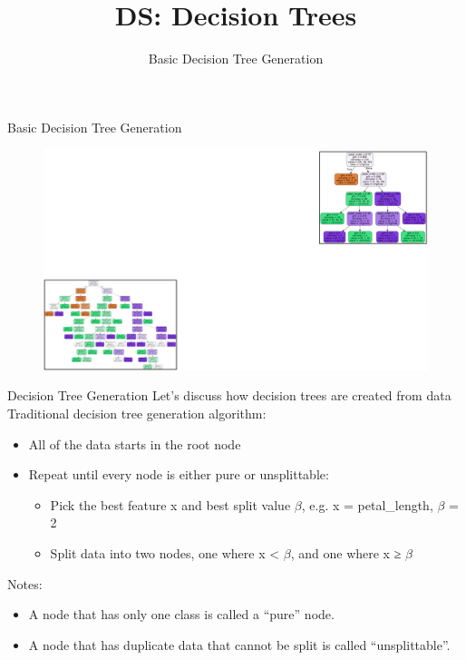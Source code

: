 \documentclass[aspectratio=169]{../latex_main/tntbeamer}  %
\title[Introduction]{DS: Decision Trees}
\subtitle{Basic Decision Tree Generation}
\begin{document}
	
	\maketitle
	\begin{frame}{Basic Decision Tree Generation}
	    \begin{figure}
	        \centering
	        \includegraphics[scale=.3]{Bild40}
	    \end{figure}
	\end{frame}
	
	\begin{frame}{Decision Tree Generation}
	    Let’s discuss how decision trees are created from data\\
	    \bigskip
	    Traditional decision tree generation algorithm: 
	    \begin{itemize}
	        \item All of the data starts in the root node
	        \item Repeat until every node is either pure or unsplittable:
	        \begin{itemize}
	            \item Pick the best feature x and best split value $\beta$, e.g. x = petal\_length, $\beta$ = 2
	            \item Split data into two nodes, one where x < $\beta$, and one where x ≥ $\beta$
	        \end{itemize}
	    \end{itemize}
	    
Notes: 
\begin{itemize}
    \item A node that has only one class is called a “\alert{pure}” node.
    \item A node that has duplicate data that cannot be split is called “\alert{unsplittable}”.
\end{itemize}

	\end{frame}
	
\end{document}
